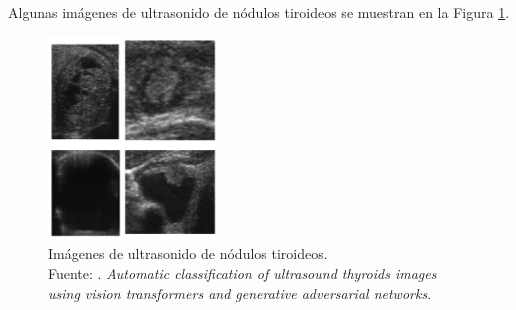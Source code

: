 Algunas imágenes de ultrasonido de nódulos tiroideos se muestran en la Figura \ref{2:fig210}.

\begin{figure}[H]
	\begin{center}
		\includegraphics[width=0.40\textwidth]{2/figures/imagenes_ultrasonido_originales.png}
		\caption[Imágenes de ultrasonido de nódulos tiroideos]{Imágenes de ultrasonido de nódulos tiroideos. \\
		Fuente: \cite{pr_JERBI2023autoclassViTGAN}. \textit{Automatic classification of ultrasound thyroids images using vision transformers and generative adversarial networks}.}
		\label{2:fig210}
	\end{center}
\end{figure}